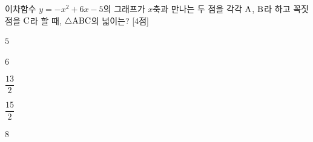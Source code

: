 이차함수 $y=-x^2+6x-5$의 그래프가 $x$축과 만나는 두 점을 각각 $\mathrm{A}$, $\mathrm{B}$라 하고 꼭짓점을 $\mathrm{C}$라 할 때, $\triangle\mathrm{ABC}$의 넓이는? \mbox{[4점]}
\begin{choices32}{\rule[-3ex]{0pt}{8ex}$5$}{\rule[-3ex]{0pt}{8ex}$6$}{\rule[-3ex]{0pt}{8ex}$\dfrac{13}{2}$}{\rule[-3ex]{0pt}{8ex}$\dfrac{15}{2}$}{\rule[-3ex]{0pt}{8ex}$8$}\end{choices32}
